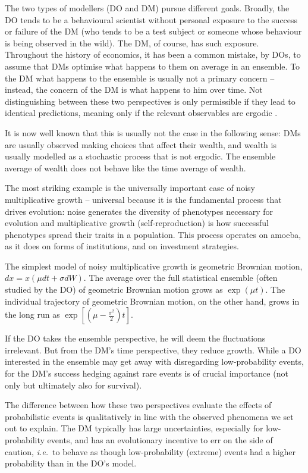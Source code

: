\documentclass[a4paper, 12pt]{article}
\newcommand{\ie}{{\it i.e.}\ }
\begin{document}
The two types of modellers (DO and DM) pursue different goals. Broadly, the DO tends to be a behavioural scientist without personal exposure to the success or failure of the DM (who tends to be a test subject or someone whose behaviour is being observed in the wild). The DM, of course, has such exposure. Throughout the history of economics, it has been a common mistake, by DOs, to assume that DMs optimise what happens to them on average in an ensemble. To the DM what happens to the ensemble is usually not a primary concern -- instead, the concern of the DM is what happens to him over time. Not distinguishing between these two perspectives is only permissible if they lead to identical predictions, meaning only if the relevant observables are ergodic \citep{Peters2019b}. 

It is now well known that this is usually not the case in the following sense: DMs are usually observed making choices that affect their wealth, and wealth is usually modelled as a stochastic process that is not ergodic. The ensemble average of wealth does not behave like the time average of wealth.

The most striking example is the universally important case of noisy multiplicative growth -- universal because it is the fundamental process that drives evolution: noise generates the diversity of phenotypes necessary for evolution and multiplicative growth (self-reproduction) is how successful phenotypes spread their traits in a population. This process operates on amoeba, as it does on forms of institutions, and on investment strategies.

The simplest model of noisy multiplicative growth is geometric Brownian motion, $dx=x(\mu dt+\sigma dW)$. The average over the full statistical ensemble (often studied by the DO) of geometric Brownian motion grows as $\exp(\mu t)$. The individual trajectory of geometric Brownian motion, on the other hand, grows in the long run as $\exp[(\mu-\frac{\sigma^2}{2})t]$.

If the DO takes the ensemble perspective, he will deem the fluctuations irrelevant. But from the DM's time perspective, they reduce growth. While a DO interested in the ensemble may get away with disregarding low-probability events, for the DM's success hedging against rare events is of crucial importance (not only but ultimately also for survival).

The difference between how these two perspectives evaluate the effects of probabilistic events is qualitatively in line with the observed phenomena we set out to explain. The DM typically has large uncertainties, especially for low-probability events, and has an evolutionary incentive to err on the side of caution, \ie to behave as though low-probability (extreme) events had a higher probability than in the DO's model.
\end{document}
